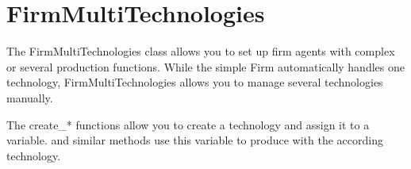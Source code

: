 \documentclass[letterpaper,10pt,english]{sphinxmanual}
\begin{document}
\chapter{FirmMultiTechnologies}
\label{FirmMultiTechnologies:firmmultitechnologies}\label{FirmMultiTechnologies::doc}\label{FirmMultiTechnologies:module-firmmultitechnologies}
The FirmMultiTechnologies class allows you to set up firm agents with
complex or several production functions. While the simple Firm automatically
handles one technology, FirmMultiTechnologies allows you to manage several
technologies manually.

The create\_* functions allow you to create a technology and assign it to
a variable. {\hyperref[FirmMultiTechnologies:abce.FirmMultiTechnologies.produce]{}} and similar
methods use this variable to produce with the according technology.
\end{document}
